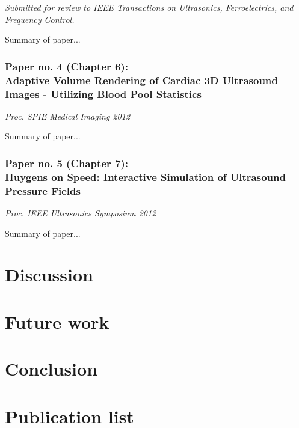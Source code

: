 {\it Submitted for review to IEEE Transactions on Ultrasonics, Ferroelectrics, and Frequency Control.}
\vspace{0.3 cm}

Summary of paper...

\subsubsection{Paper no. 4 (Chapter 6):\\
Adaptive Volume Rendering of Cardiac 3D Ultrasound Images - Utilizing Blood Pool Statistics}

{\it Proc. SPIE Medical Imaging 2012}
\vspace{0.3 cm}

Summary of paper...

\subsubsection{Paper no. 5 (Chapter 7):\\
Huygens on Speed: Interactive Simulation of Ultrasound Pressure Fields}

{\it Proc. IEEE Ultrasonics Symposium 2012}
\vspace{0.3 cm}

Summary of paper...

\section{Discussion}

\section{Future work}

\section{Conclusion}

\section{Publication list}

